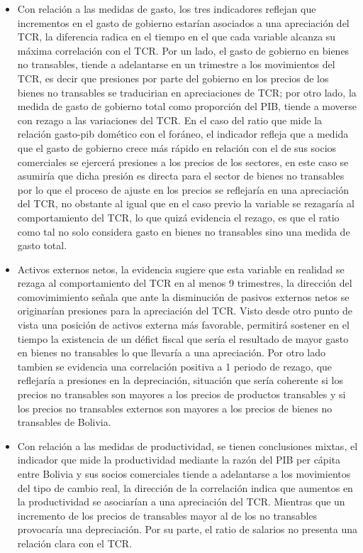 \documentclass[12pt,letterpaper]{article}
\begin{document}
\begin{itemize}
\item Con relación a las medidas de gasto, los tres indicadores reflejan que incrementos en el gasto de gobierno estarían asociados a una apreciación del TCR, la diferencia radica en el tiempo en el que cada variable alcanza su máxima correlación con el TCR. Por un lado, el gasto de gobierno en bienes no transables, tiende a adelantarse en un trimestre a los movimientos del TCR, es decir que presiones por parte del gobierno en los precios de los bienes no transables se traducirian en apreciaciones de TCR; por otro lado, la medida de gasto de gobierno total como proporción del PIB, tiende a moverse con rezago a las variaciones del TCR. 
En el caso del ratio que mide la relación gasto-pib domético con el foráneo, el indicador refleja que a medida que el gasto de gobierno crece más rápido en relación con el de sus socios comerciales se ejercerá presiones a los precios de los sectores, en este caso se asumiría que dicha presión es directa para el sector de bienes no transables por lo que el proceso de ajuste en los precios se reflejaría en una apreciación del TCR, no obstante al igual que en el caso previo la variable se rezagaría al comportamiento del TCR, lo que quizá evidencia el rezago, es que el ratio como tal no solo considera gasto en bienes no transables sino una medida de gasto total. 
\item Activos externos netos, la evidencia sugiere que esta variable en realidad se rezaga al comportamiento del TCR en al menos 9 trimestres, la dirección del comovimimiento señala que ante la disminución de pasivos externos netos se originarían presiones para la apreciación del TCR. Visto desde otro punto de vista una posición de activos externa más favorable, permitirá sostener en el tiempo la existencia de un défict fiscal que sería el resultado de mayor gasto en bienes no transables lo que llevaría a una apreciación. Por otro lado tambien se evidencia una correlación positiva a 1 periodo de rezago, que reflejaría a presiones en la depreciación, situación que sería coherente  si los precios no transables son mayores a los precios de productos transables y si los precios no transables externos son mayores a los precios de bienes no transables de Bolivia. 
\item Con relación a las medidas de productividad, se tienen conclusiones mixtas, el indicador que mide la productividad mediante la razón del PIB per cápita entre Bolivia y sus socios comerciales tiende a adelantarse a los movimientos del tipo de cambio real, la dirección de la correlación indica que aumentos en la productividad se asociarían a una apreciación del TCR. Mientras que un incremento de los precios de transables mayor al de los no transables provocaría una depreciación. Por su parte, el ratio de salarios no presenta una relación clara con el TCR.

\end{itemize}
\end{document}
